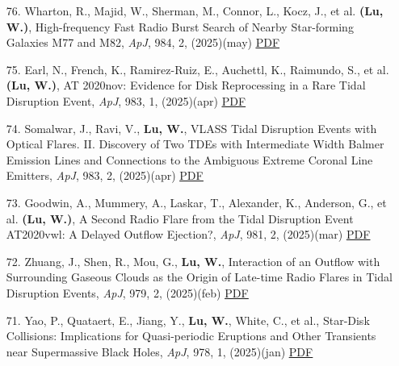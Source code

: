 \begin{itemize}[leftmargin=0.65cm]
\vspace{-0.1cm}
\item[76.]{Wharton, R., Majid, W., Sherman, M., Connor, L., Kocz, J., et al. {\bf (Lu, W.)}, {High-frequency Fast Radio Burst Search of Nearby Star-forming Galaxies M77 and M82}, {\it ApJ}, 984, 2, (2025)(may) \href{https://ui.adsabs.harvard.edu/abs/2025ApJ...984..119W}{\underline{PDF}}}

\vspace{-0.1cm}
\item[75.]{Earl, N., French, K., Ramirez-Ruiz, E., Auchettl, K., Raimundo, S., et al. {\bf (Lu, W.)}, {AT 2020nov: Evidence for Disk Reprocessing in a Rare Tidal Disruption Event}, {\it ApJ}, 983, 1, (2025)(apr) \href{https://ui.adsabs.harvard.edu/abs/2025ApJ...983...28E}{\underline{PDF}}}

\vspace{-0.1cm}
\item[74.]{Somalwar, J., Ravi, V., {\bf Lu, W.}, {VLASS Tidal Disruption Events with Optical Flares. II. Discovery of Two TDEs with Intermediate Width Balmer Emission Lines and Connections to the Ambiguous Extreme Coronal Line Emitters}, {\it ApJ}, 983, 2, (2025)(apr) \href{https://ui.adsabs.harvard.edu/abs/2025ApJ...983..159S}{\underline{PDF}}}

\vspace{-0.1cm}
\item[73.]{Goodwin, A., Mummery, A., Laskar, T., Alexander, K., Anderson, G., et al. {\bf (Lu, W.)}, {A Second Radio Flare from the Tidal Disruption Event AT2020vwl: A Delayed Outflow Ejection?}, {\it ApJ}, 981, 2, (2025)(mar) \href{https://ui.adsabs.harvard.edu/abs/2025ApJ...981..122G}{\underline{PDF}}}

\vspace{-0.1cm}
\item[72.]{Zhuang, J., Shen, R., Mou, G., {\bf Lu, W.}, {Interaction of an Outflow with Surrounding Gaseous Clouds as the Origin of Late-time Radio Flares in Tidal Disruption Events}, {\it ApJ}, 979, 2, (2025)(feb) \href{https://ui.adsabs.harvard.edu/abs/2025ApJ...979..109Z}{\underline{PDF}}}

\vspace{-0.1cm}
\item[71.]{Yao, P., Quataert, E., Jiang, Y., {\bf Lu, W.}, White, C., et al., {Star‑Disk Collisions: Implications for Quasi-periodic Eruptions and Other Transients near Supermassive Black Holes}, {\it ApJ}, 978, 1, (2025)(jan) \href{https://ui.adsabs.harvard.edu/abs/2025ApJ...978...91Y}{\underline{PDF}}}


\end{itemize}
